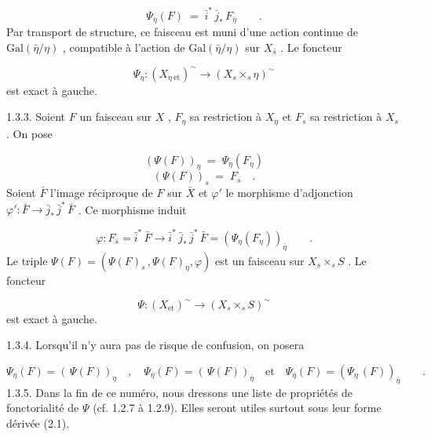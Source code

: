 \begin{equation}\tag{1.3.2.2}
\Psi_\eta (F) \; = \; \bar i^* \, \bar j_* \, F_{\bar\eta} \qquad .
\end{equation}
Par transport de structure, ce faisceau est muni d'une action continue de $\mathrm{Gal}(\bar\eta / \eta)$ , compatible à l'action de $\mathrm{Gal}(\bar\eta/\eta)$ sur $X_{\bar s}$ . Le foncteur

\begin{equation}\tag{1.3.2.3}
\Psi_\eta : (X_{\eta \ \mathrm{et}})^{\sim} \longrightarrow (X_s \times_s \eta)^{\sim}
\end{equation}
est exact à gauche.

1.3.3. Soient $F$ un faisceau sur $X$ , $F_\eta$ sa restriction à $X_\eta$ et $F_s$ sa restriction à $X_s$ . On pose 



\begin{equation}\tag{1.3.3.1}
 (\Psi (F))_\eta \; = \; \Psi_\eta(F_\eta)
\end{equation}
\begin{equation}\tag{1.3.3.2}
(\Psi (F))_s \; = \; F_s \quad .
\end{equation}
Soient $\bar F$ l'image réciproque de $F$ sur $\bar X$ et $\varphi'$ le morphisme d'adjonction $\varphi' : \bar F \longrightarrow \bar j_* \, \bar j^* \, \bar F$ . Ce morphisme induit

\begin{equation*}
\varphi : F_{\bar s} = \bar i^* \, \bar F \longrightarrow \bar i^* \, \bar j_* \, \bar j^* \, \bar F = (\Psi_\eta(F_\eta))_{\bar\eta} \qquad .
\end{equation*}
Le triple $\Psi(F) = (\Psi(F)_s \, , \Psi(F)_\eta, \varphi)$ est un faisceau sur $X_s \times_s S$ . Le foncteur

\begin{equation}\tag{1.3.3.3}
\Psi : (X_{\mathrm{et}})^{\sim} \longrightarrow (X_s \times_s S)^{\sim}
\end{equation}
est exact à gauche.

1.3.4. Lorsqu'il n'y aura pas de risque de confusion, on posera

\begin{equation*}
\Psi_\eta(F) = (\, \Psi(F))_\eta \quad , \quad \Psi_{\bar\eta}(F) = (\, \Psi(F))_{\bar\eta} \quad \mathrm{et} \quad \Psi_{\bar\eta}(F) = (\Psi_\eta \, (F))_{\bar\eta} \qquad .
\end{equation*}
1.3.5. Dans la fin de ce numéro, nous dressons une liste de propriétés de fonctorialité de $\Psi$ (cf. 1.2.7 à 1.2.9). Elles seront utiles surtout sous leur forme dérivée (2.1).

